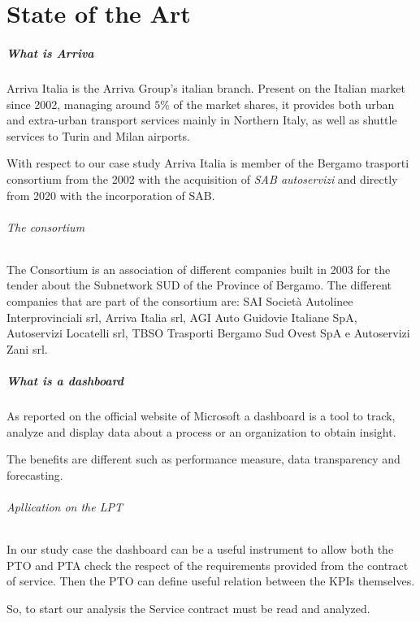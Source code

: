 \chapter{State of the Art}

\paragraph{What is Arriva}
Arriva Italia is the Arriva Group’s italian branch. Present on the Italian market since 2002, managing around $5\%$ of the market shares, it provides both urban and extra-urban transport services mainly in Northern Italy, as well as shuttle services to Turin and Milan airports.

With respect to our case study Arriva Italia is member of the Bergamo trasporti consortium from the 2002 with the acquisition of \emph{SAB autoservizi} and directly from 2020 with the incorporation of SAB.

\subparagraph{The consortium}
The Consortium is an association of different companies built in 2003 for the tender about the Subnetwork SUD of the Province of Bergamo.
The different companies that are part of the consortium are: SAI Società Autolinee Interprovinciali srl, Arriva Italia srl, AGI Auto Guidovie Italiane SpA, Autoservizi Locatelli srl, TBSO Trasporti Bergamo Sud Ovest SpA e Autoservizi Zani srl.

\paragraph{What is a dashboard}
As reported on the official website of Microsoft a dashboard is a tool to track, analyze and display data about a process or an organization to obtain insight.

The benefits are different such as performance measure, data transparency and forecasting.


\subparagraph{Apllication on the LPT}

In our study case the dashboard can be a useful instrument to allow both the PTO and PTA check the respect of the requirements provided from the contract of service. Then the PTO can define useful relation between the KPIs themselves. 

So, to start our analysis the Service contract must be read and analyzed.